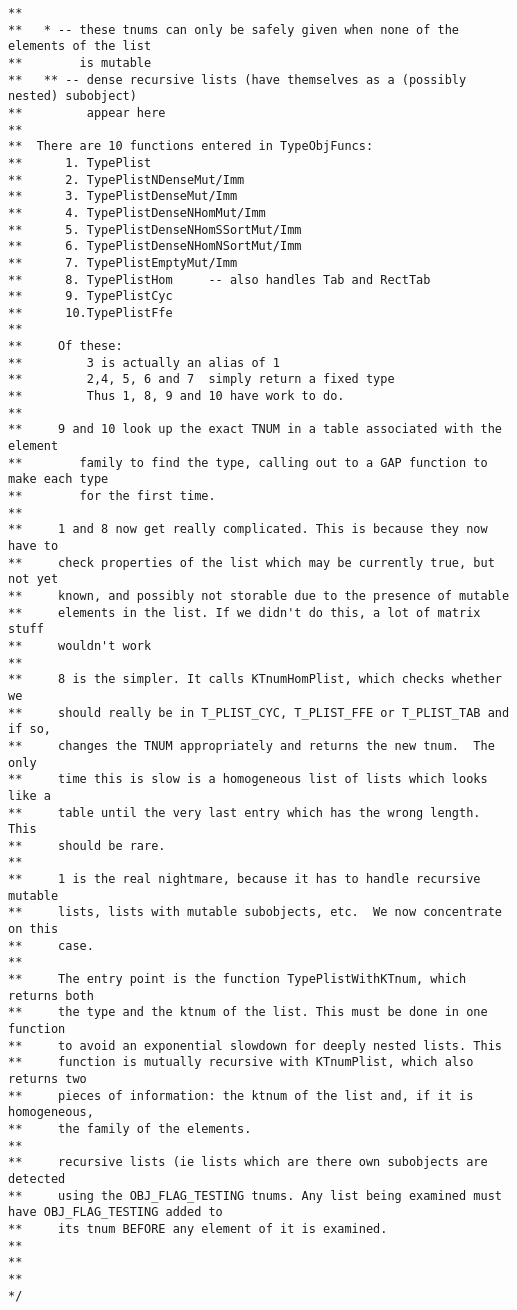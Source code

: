 \documentclass{article}
\begin{document}
\begin{verbatim}
**
**   * -- these tnums can only be safely given when none of the elements of the list
**        is mutable
**   ** -- dense recursive lists (have themselves as a (possibly nested) subobject)
**         appear here
**
**  There are 10 functions entered in TypeObjFuncs:
**      1. TypePlist
**      2. TypePlistNDenseMut/Imm
**      3. TypePlistDenseMut/Imm
**      4. TypePlistDenseNHomMut/Imm
**      5. TypePlistDenseNHomSSortMut/Imm
**      6. TypePlistDenseNHomNSortMut/Imm
**      7. TypePlistEmptyMut/Imm
**      8. TypePlistHom     -- also handles Tab and RectTab
**      9. TypePlistCyc
**      10.TypePlistFfe
**
**     Of these:
**         3 is actually an alias of 1
**         2,4, 5, 6 and 7  simply return a fixed type
**         Thus 1, 8, 9 and 10 have work to do.
**
**     9 and 10 look up the exact TNUM in a table associated with the element
**        family to find the type, calling out to a GAP function to make each type
**        for the first time.
**
**     1 and 8 now get really complicated. This is because they now have to
**     check properties of the list which may be currently true, but not yet
**     known, and possibly not storable due to the presence of mutable
**     elements in the list. If we didn't do this, a lot of matrix stuff
**     wouldn't work
**
**     8 is the simpler. It calls KTnumHomPlist, which checks whether we
**     should really be in T_PLIST_CYC, T_PLIST_FFE or T_PLIST_TAB and if so,
**     changes the TNUM appropriately and returns the new tnum.  The only
**     time this is slow is a homogeneous list of lists which looks like a
**     table until the very last entry which has the wrong length. This
**     should be rare.
**     
**     1 is the real nightmare, because it has to handle recursive mutable
**     lists, lists with mutable subobjects, etc.  We now concentrate on this
**     case.
**
**     The entry point is the function TypePlistWithKTnum, which returns both
**     the type and the ktnum of the list. This must be done in one function
**     to avoid an exponential slowdown for deeply nested lists. This
**     function is mutually recursive with KTnumPlist, which also returns two
**     pieces of information: the ktnum of the list and, if it is homogeneous,
**     the family of the elements.
**
**     recursive lists (ie lists which are there own subobjects are detected
**     using the OBJ_FLAG_TESTING tnums. Any list being examined must have OBJ_FLAG_TESTING added to
**     its tnum BEFORE any element of it is examined.
**
**     
**
*/
\end{verbatim}
\end{document}
